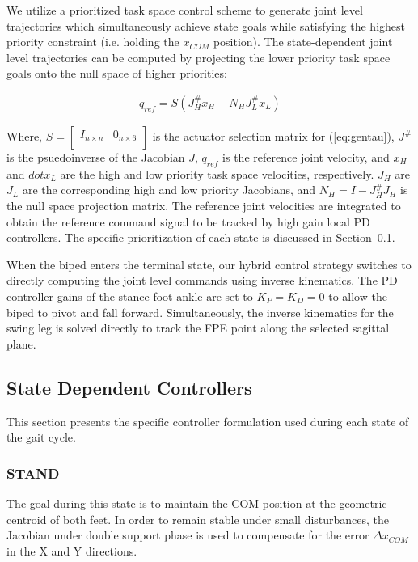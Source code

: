 We utilize a prioritized task space control scheme to generate joint level trajectories which simultaneously achieve state goals while satisfying the highest priority constraint (i.e. holding the $x_{COM}$ position). The state-dependent joint level trajectories can be computed by projecting the lower priority task space goals onto the null space of higher priorities:

\begin{eqnarray}
	\label{eq:priori}
	\dot{q}_{ref} = S(J_{H}^{\#} \dot{x}_{H} + N_{H} J_{L}^{\#} \dot{x}_{L})
\end{eqnarray}

Where, $S = \begin{bmatrix} I_{n \times n} & 0_{n \times 6} \\ \end{bmatrix}$ is the actuator selection matrix for (\ref{eq:gentau}), $J^{\#}$ is the psuedoinverse of the Jacobian $J$, $\dot{q}_{ref}$ is the reference joint velocity, and $\dot{x}_H$ and $dot{x}_L$ are the high and low priority task space velocities, respectively. $J_{H}$ are $J_{L}$ are the corresponding high and low priority Jacobians, and $N_{H} = I - J_{H}^{\#} J_{H}$ is the null space projection matrix. The reference joint velocities are integrated to obtain the reference command signal to be tracked by high gain local PD controllers. The specific prioritization of each state is discussed in Section~\ref{sub:joint_level_control}.

When the biped enters the terminal state, our hybrid control strategy switches to directly computing the joint level commands using inverse kinematics. The PD controller gains of the stance foot ankle are set to $K_{P} = K_{D} = 0$ to allow the biped to pivot and fall forward. Simultaneously, the inverse kinematics for the swing leg is solved directly to track the FPE point along the selected sagittal plane.

\subsection{State Dependent Controllers} %
\label{sub:joint_level_control}
This section presents the specific controller formulation used during each state of the gait cycle.  \\

\subsubsection{\textbf{STAND}} %
\label{ssub:stand}
The goal during this state is to maintain the COM position at the geometric centroid of both feet. In order to remain stable under small disturbances, the Jacobian under double support phase is used to compensate for the error $\Delta x_{COM}$ in the X and Y directions.

